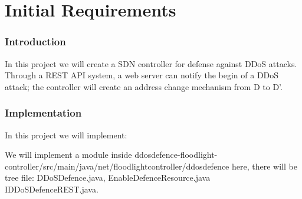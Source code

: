 \chapter{Initial Requirements}

\subsection{Introduction}
In this project we will create a SDN controller for defense against DDoS attacks. Through a REST API system, a web server can notify the begin of a DDoS attack; the controller will create an address change mechanism from D to D’.

\subsection{Implementation}
In this project we will implement:

We will implement a module inside ddosdefence-floodlight-controller/src/main/java/net/floodlightcontroller/ddosdefence here, there will be tree file: DDoSDefence.java, EnableDefenceResource.java IDDoSDefenceREST.java.

